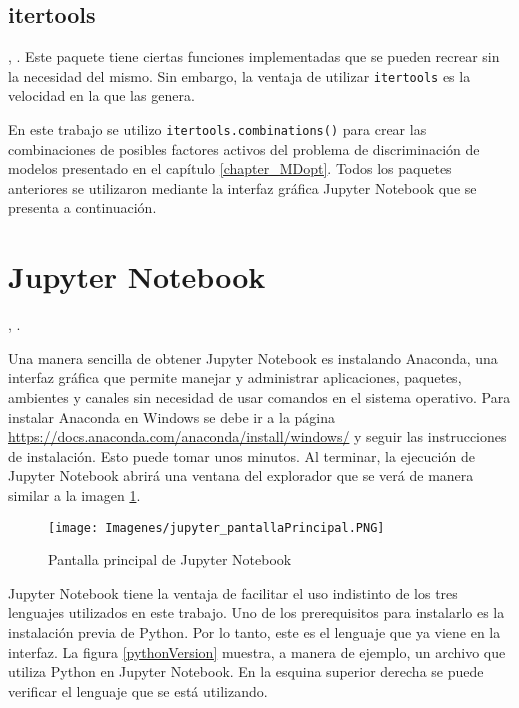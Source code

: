 \subsection{itertools}
, \cite{doc_python}. Este paquete tiene ciertas funciones implementadas que se pueden recrear sin la necesidad del mismo. Sin embargo, la ventaja de utilizar \texttt{itertools} es la velocidad en la que las genera. 

En este trabajo se utilizo \texttt{itertools.combinations()} para crear las combinaciones de posibles factores activos del problema de discriminación de modelos presentado en el capítulo \ref{chapter_MDopt}. Todos los paquetes anteriores se utilizaron mediante la interfaz gráfica \textsf{Jupyter Notebook} que se presenta a continuación.

\section{Jupyter Notebook} \label{cap_jupyter}
, \cite{jupyter_page}. 

Una manera sencilla de obtener \textsf{Jupyter Notebook} es instalando \textsf{Anaconda}, una interfaz gráfica que permite manejar y administrar aplicaciones, paquetes, ambientes y canales sin necesidad de usar comandos en el sistema operativo. Para instalar Anaconda en \textsf{Windows} se debe ir a la página \url{https://docs.anaconda.com/anaconda/install/windows/} y seguir las instrucciones de instalación. Esto puede tomar unos minutos. Al terminar, la ejecución de \textsf{Jupyter Notebook} abrirá una ventana del explorador que se verá de manera similar a la imagen \ref{jupyter_pantallaPrincipal}. 


\begin{figure}[h]
	\begin{center}
		\texttt{[image: Imagenes/jupyter\_pantallaPrincipal.PNG]}
		\caption{Pantalla principal de Jupyter Notebook}
		\label{jupyter_pantallaPrincipal}
	\end{center}
\end{figure}


\textsf{Jupyter Notebook} tiene la ventaja de facilitar el uso indistinto de los tres lenguajes utilizados en este trabajo. Uno de los prerequisitos para instalarlo es la instalación previa de \textsf{Python}. Por lo tanto, este es el lenguaje que ya viene en la interfaz. La figura \ref{pythonVersion} muestra, a manera de ejemplo, un archivo que utiliza \textsf{Python} en \textsf{Jupyter Notebook}. En la esquina superior derecha se puede verificar el lenguaje que se está utilizando. 

